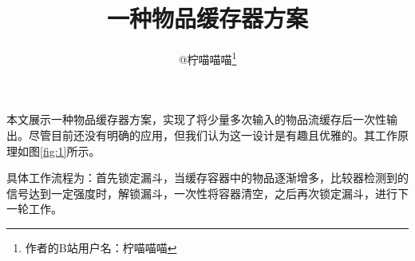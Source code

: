 \documentclass[UTF8,12pt,punct=kaiming,fontset=none]{ctexart}
\title{\vspace{-1.5cm}一种物品缓存器方案\vspace{-0.5cm}}
\author{@柠喵喵喵\thanks{作者的B站用户名：柠喵喵喵}}
\date{}
\begin{document}
\hypersetup{bookmarksdepth=-1}  %
\maketitle
\thispagestyle{fancy}  %
\vspace{-0.7cm}

\titleformat{\section}[hang]{\large\sffamily\bfseries}{\textmd{\thesection}}{0.5cm}{}
\titlespacing{\section}{0cm}{0.5ex}{0.2ex}
\titleformat{\subsection}[hang]{\normalsize\sffamily}{\textmd{\thesubsection}}{0.5cm}{}
\titlespacing{\subsection}{0cm}{0.5ex}{0.2ex}
\setcounter{section}{0}

本文展示一种物品缓存器方案，实现了将少量多次输入的物品流缓存后一次性输出。尽管目前还没有明确的应用，但我们认为这一设计是有趣且优雅的。其工作原理如图\ref{fig:1}所示。

具体工作流程为：首先锁定漏斗，当缓存容器中的物品逐渐增多，比较器检测到的信号达到一定强度时，解锁漏斗，一次性将容器清空，之后再次锁定漏斗，进行下一轮工作。
\end{document}
